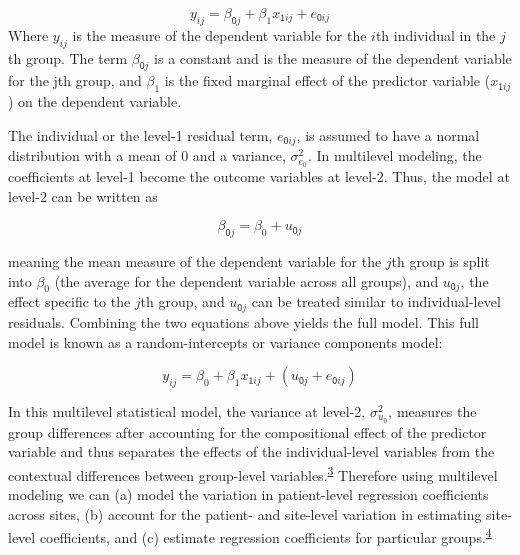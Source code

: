 \documentclass[
  10pt,
]{article}
\begin{document}
\[y_{ij} = \beta_{\textsf{0}j} + \beta_{1}x_{\textsf{1}ij} + e_{\textsf{0}ij}\]
Where \(y_{ij}\) is the measure of the dependent variable for the
\(i\)th individual in the \(j\)th group. The term
\(\beta_{\textsf{0}j}\) is a constant and is the measure of the
dependent variable for the jth group, and \(\beta_{1}\) is the fixed
marginal effect of the predictor variable (\(x_{\textsf{1}ij}\)) on the
dependent variable.

The individual or the level-1 residual term, \(e_{\textsf{0}ij}\), is
assumed to have a normal distribution with a mean of 0 and a variance,
\(\sigma^2_{e_{0}}\). In multilevel modeling, the coefficients at
level-1 become the outcome variables at level-2. Thus, the model at
level-2 can be written as

\[\beta_{\textsf{0}j} = \beta_{0} + u_{\textsf{0}j}\]

meaning the mean measure of the dependent variable for the \(j\)th group
is split into \(\beta_{0}\) (the average for the dependent variable
across all groups), and \(u_{\textsf{0}j}\), the effect specific to the
\(j\)th group, and \(u_{\textsf{0}j}\) can be treated similar to
individual-level residuals. Combining the two equations above yields the
full model. This full model is known as a random-intercepts or variance
components model:

\[y_{ij} = \beta_{0} + \beta_{1}x_{\textsf{1}ij} + (u_{\textsf{0}j} + e_{\textsf{0}ij})\]

In this multilevel statistical model, the variance at level-2,
\(\sigma^2_{u_{0}}\), measures the group differences after accounting
for the compositional effect of the predictor variable and thus
separates the effects of the individual-level variables from the
contextual differences between group-level
variables.\textsuperscript{\protect\hyperlink{ref-subramanian2004}{3}}
Therefore using multilevel modeling we can (a) model the variation in
patient-level regression coefficients across sites, (b) account for the
patient- and site-level variation in estimating site-level coefficients,
and (c) estimate regression coefficients for particular
groups.\textsuperscript{\protect\hyperlink{ref-gelman2007}{4}}
\end{document}
